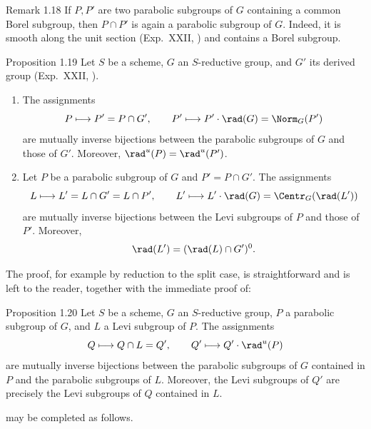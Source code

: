 \begin{sgastatement}{Remark 1.18}
If \(P,P'\) are two parabolic subgroups of \(G\) containing a common Borel
subgroup, then \(P\cap P'\) is again a parabolic subgroup of \(G\).  Indeed,
it is smooth along the unit section \textup{(Exp.\ XXII, )} and
contains a Borel subgroup.
\end{sgastatement}

\begin{sgastatement}{Proposition 1.19}
Let \(S\) be a scheme, \(G\) an \(S\)-reductive group, and \(G'\) its
derived group \textup{(Exp.\ XXII, )}.
\begin{enumerate}[label=\textup{(\roman*)}]
\item The assignments
\[
 P\longmapsto P'=P\cap G',
 \qquad
 P'\longmapsto P'\cdot\rad(G)=\Norm_G(P')
\]
are mutually inverse bijections between the parabolic subgroups of \(G\)
and those of \(G'\).  Moreover,
\(\rad^u(P)=\rad^u(P')\).
\item Let \(P\) be a parabolic subgroup of \(G\) and \(P'=P\cap G'\).
The assignments
\[
 L\longmapsto L'=L\cap G'=L\cap P',
 \qquad
 L'\longmapsto L'\cdot\rad(G)=\Centr_G(\rad(L'))
\]
are mutually inverse bijections between the Levi subgroups of \(P\) and
those of \(P'\).  Moreover,
\[
 \rad(L')=(\rad(L)\cap G')^0.
\]
\end{enumerate}
\end{sgastatement}

The proof, for example by reduction to the split case, is straightforward
and is left to the reader, together with the immediate proof of:

\begin{sgastatement}{Proposition 1.20}
Let \(S\) be a scheme, \(G\) an \(S\)-reductive group, \(P\) a parabolic
subgroup of \(G\), and \(L\) a Levi subgroup of \(P\).  The assignments
\[
 Q\longmapsto Q\cap L=Q',
 \qquad
 Q'\longmapsto Q'\cdot\rad^u(P)
\]
are mutually inverse bijections between the parabolic subgroups of \(G\)
contained in \(P\) and the parabolic subgroups of \(L\).  Moreover, the
Levi subgroups of \(Q'\) are precisely the Levi subgroups of \(Q\)
contained in \(L\).
\end{sgastatement}

 may be completed as follows.

